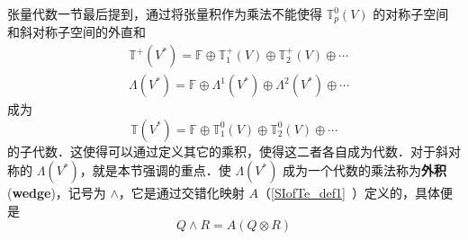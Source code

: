 
\begin{issues}
\issueMissDepend
{}
\end{issues}




张量代数一节最后提到，通过将张量积作为乘法不能使得 $\mathbb T_p^0(V)$ 的对称子空间和斜对称子空间的外直和 
\begin{equation}
\begin{aligned}
&\mathbb T^+(V^*)=\mathbb F\oplus\mathbb T_1^+(V)\oplus\mathbb T_2^+(V)\oplus\cdots\\
&\Lambda(V^*)=\mathbb F\oplus \Lambda^1(V^*)\oplus\Lambda^2(V^*)\oplus\cdots
\end{aligned}
\end{equation}
成为 
\begin{equation}
\mathbb T(V^*)=\mathbb F\oplus\mathbb T_1^0(V)\oplus\mathbb T_2^0(V)\oplus\cdots
\end{equation}
的子代数．这使得可以通过定义其它的乘积，使得这二者各自成为代数．对于斜对称的 $\Lambda(V^*)$，就是本节强调的重点．使 $\Lambda(V^*)$ 成为一个代数的乘法称为\textbf{外积}(\textbf{wedge})，记号为 $\wedge$，它是通过交错化映射 $A$（\autoref{SIofTe_def1}~）定义的，具体便是
\begin{equation}
Q\wedge R=A(Q\otimes R)
\end{equation}

